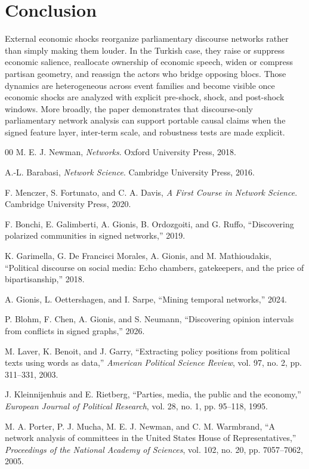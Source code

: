 \documentclass[11pt]{article}
\begin{document}
\section{Conclusion}
External economic shocks reorganize parliamentary discourse networks rather than simply making them louder. In the Turkish case, they raise or suppress economic salience, reallocate ownership of economic speech, widen or compress partisan geometry, and reassign the actors who bridge opposing blocs. Those dynamics are heterogeneous across event families and become visible once economic shocks are analyzed with explicit pre-shock, shock, and post-shock windows. More broadly, the paper demonstrates that discourse-only parliamentary network analysis can support portable causal claims when the signed feature layer, inter-term scale, and robustness tests are made explicit.

\begin{thebibliography}{00}
M. E. J. Newman, \emph{Networks}. Oxford University Press, 2018.

A.-L. Barabasi, \emph{Network Science}. Cambridge University Press, 2016.

F. Menczer, S. Fortunato, and C. A. Davis, \emph{A First Course in Network Science}. Cambridge University Press, 2020.

F. Bonchi, E. Galimberti, A. Gionis, B. Ordozgoiti, and G. Ruffo, ``Discovering polarized communities in signed networks,'' 2019.

K. Garimella, G. De Francisci Morales, A. Gionis, and M. Mathioudakis, ``Political discourse on social media: Echo chambers, gatekeepers, and the price of bipartisanship,'' 2018.

A. Gionis, L. Oettershagen, and I. Sarpe, ``Mining temporal networks,'' 2024.

P. Blohm, F. Chen, A. Gionis, and S. Neumann, ``Discovering opinion intervals from conflicts in signed graphs,'' 2026.

M. Laver, K. Benoit, and J. Garry, ``Extracting policy positions from political texts using words as data,'' \emph{American Political Science Review}, vol. 97, no. 2, pp. 311--331, 2003.

J. Kleinnijenhuis and E. Rietberg, ``Parties, media, the public and the economy,'' \emph{European Journal of Political Research}, vol. 28, no. 1, pp. 95--118, 1995.

M. A. Porter, P. J. Mucha, M. E. J. Newman, and C. M. Warmbrand, ``A network analysis of committees in the United States House of Representatives,'' \emph{Proceedings of the National Academy of Sciences}, vol. 102, no. 20, pp. 7057--7062, 2005.
\end{thebibliography}
\end{document}

